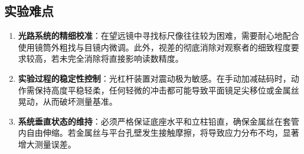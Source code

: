 \documentclass{../../templates/Report}%
\begin{document}
\subsection{实验难点}
\begin{enumerate}
    \item \textbf{光路系统的精细校准}：在望远镜中寻找标尺像往往较为困难，需要耐心地配合使用镜筒外粗找与目镜内微调。此外，视差的彻底消除对观察者的细致程度要求较高，若未完全消除将直接影响读数精度。
    \item \textbf{实验过程的稳定性控制}：光杠杆装置对震动极为敏感。在手动加减砝码时，动作需保持高度平稳轻柔，任何轻微的冲击都可能导致平面镜足尖移位或金属丝晃动，从而破坏测量基准。
    \item \textbf{系统垂直状态的维持}：必须严格保证底座水平和立柱铅直，确保金属丝在套管内自由伸缩。若金属丝与平台孔壁发生接触摩擦，将导致应力分布不均，显著增大测量误差。
\end{enumerate}
\end{document}
